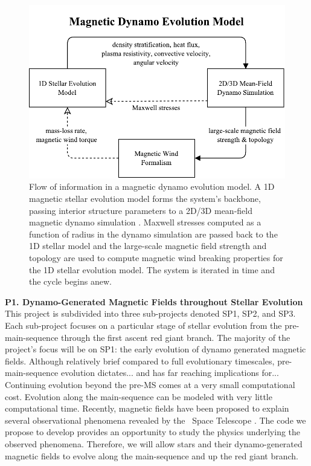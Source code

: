 \documentclass[12pt,a4paper]{article}
\begin{document}
\begin{figure}
	\centering
	\includegraphics[width=0.75\linewidth]{./fig/dynamo_evolution.pdf}
	\caption{\small Flow of information in a magnetic dynamo evolution model. A 1D magnetic stellar evolution model \citep[{\sc dmestar};][]{FC12b} forms the system's backbone, passing interior structure parameters to a 2D/3D mean-field magnetic dynamo simulation \citep[{\sc pencil} code;][]{Brandenburg2002}. Maxwell stresses computed as a function of radius in the dynamo simulation are passed back to the 1D stellar model and the large-scale magnetic field strength and topology are used to compute magnetic wind breaking properties \citep[e.g.,][]{Reville2015} for the 1D stellar evolution model. The system is iterated in time and the cycle begins anew.}
	\label{fig:schematic}
\end{figure}

\textbf{P1. Dynamo-Generated Magnetic Fields throughout Stellar Evolution} \\
This project is subdivided into three sub-projects denoted SP1, SP2, and SP3. Each sub-project focuses on a particular stage of stellar evolution from the pre-main-sequence through the first ascent red giant branch. The majority of the project's focus will be on SP1: the early evolution of dynamo generated magnetic fields. Although relatively brief compared to full evolutionary timescales, pre-main-sequence evolution dictates... and has far reaching implications for... Continuing evolution beyond the pre-MS comes at a very small computational cost. Evolution along the main-sequence can be modeled with very little computational time. Recently, magnetic fields have been proposed to explain several observational phenomena revealed by the \kepler\ Space Telescope \citep{Fuller2015, vanSaders2016}. The code we propose to develop provides an opportunity to study the physics underlying the observed phenomena. Therefore, we will allow stars and their dynamo-generated magnetic fields to evolve along the main-sequence and up the red giant branch. 
\end{document}
